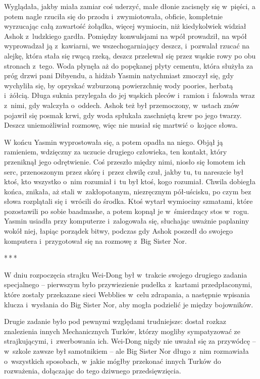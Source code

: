 \documentclass[oneside,polish,11pt,rmheadings]{mwbk}
\newcommand{\threeast}{\par\centerline{*\,*\,*}\medskip\par}
\begin{document}
 Wyglądała, jakby miała zamiar coś uderzyć, małe dłonie zacisnęły się w~pięści, a potem nagle rzuciła się do przodu i~zwymiotowała, obficie, kompletnie wyrzucając całą zawartość żołądka, więcej wymiocin, niż kiedykolwiek widział Ashok z~ludzkiego gardła. Pomiędzy konwulsjami na wpół prowadził, na wpół wyprowadzał ją z~kawiarni, we wszechogarniający deszcz, i~pozwalał rzucać na alejkę, która stała się rwącą rzeką, deszcz przelewał się przez wąskie rowy po obu stronach z~tego. Woda płynęła aż do popękanej płyty cementu, która służyła za próg drzwi pani Dibyendu, a hidżab Yasmin natychmiast zmoczył się, gdy wychyliła się, by opryskać wzburzoną powierzchnię wody poories, herbatą i~żółcią. Długa suknia przylegała do jej wąskich pleców i~ramion i~falowała wraz z~nimi, gdy walczyła o~oddech. Ashok też był przemoczony, w~ustach znów pojawił się posmak krwi, gdy woda spłukała zaschniętą krew po jego twarzy. Deszcz uniemożliwiał rozmowę, więc nie musiał się martwić o~kojące słowa.

W końcu Yasmin wyprostowała się, a potem opadła na niego. Objął ją ramieniem, wdzięczny za uczucie drugiego człowieka, ten kontakt, który przeniknął jego odrętwienie. Coś przeszło między nimi, niosło się łomotem ich serc, przenoszonym przez skórę i~przez chwilę czuł, jakby tu, tu nareszcie był ktoś, kto wszystko o~nim rozumiał i~tu był ktoś, kogo rozumiał. Chwila dobiegła końca, znikała, aż stali w~zakłopotanym, niezręcznym pół-uścisku, po czym bez słowa rozplątali się i~wrócili do środka. Ktoś wytarł wymiociny szmatami, które pozostawili po sobie baadmashe, a potem kopnął je w~śmierdzący stos w~rogu. Yasmin usiadła przy komputerze i~zalogowała się, słuchając uważnie paplaniny wokół niej, łapiąc porządek bitwy, podczas gdy Ashok poszedł do swojego komputera i~przygotował się na rozmowę z~Big Sister Nor.

\bigskip
\threeast

W dniu rozpoczęcia strajku Wei-Dong był w~trakcie swojego drugiego zadania specjalnego -- pierwszym było przywiezienie pudełka z~kartami przedpłaconymi, które zostały przekazane sieci Webblies w~celu zdrapania, a następnie wpisania klucza i~wysłania do Big Sister Nor, aby mogła podzielić je między bojowników.

Drugie zadanie było pod pewnymi względami trudniejsze: dostał rozkaz znalezienia innych Mechanicznych Turków, którzy mogliby sympatyzować ze strajkującymi, i~zwerbowania ich. Wei-Dong nigdy nie uważał się za przywódcę -- w~szkole zawsze był samotnikiem -- ale Big Sister Nor długo z~nim rozmawiała o~wszystkich sposobach, w~jakie mógłby przekonać innych Turków do rozważenia, dołączając do tego dziwnego przedsięwzięcia.
\end{document}
